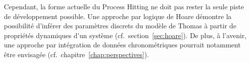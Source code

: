 Cependant, la forme actuelle du Process Hitting ne doit pas rester la seule piste de développement possible.
Une approche par logique de Hoare démontre la possibilité d'inférer des paramètres discrets du modèle de Thomas à partir de propriétés dynamiques d'un système (cf.~section~\ref{sec:hoare}).
De plus, à l'avenir, une approche par intégration de données chronométriques pourrait notamment être envisagée (cf.~chapitre~\ref{chap:perspectives}).
